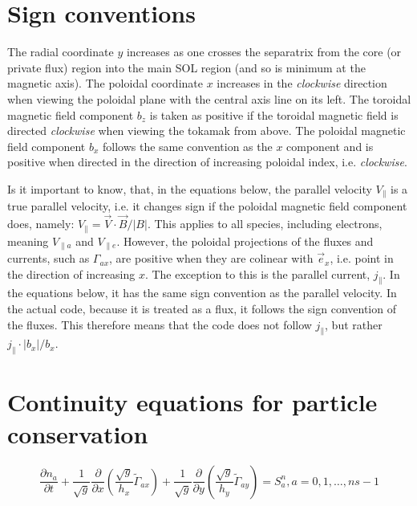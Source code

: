\documentclass[a4paper,10pt]{report}
\begin{document}
\section*{Sign conventions}

The radial coordinate $y$ increases as one crosses the separatrix from the core (or private flux) region into the main SOL region (and so is minimum at the magnetic axis). The poloidal coordinate $x$ increases in the {\em clockwise} direction when viewing the poloidal plane with the central axis line on its left. The toroidal magnetic field component $b_z$ is taken as positive if the toroidal magnetic field is directed {\em clockwise} when viewing the tokamak from above. The poloidal magnetic field component $b_x$ follows the same convention as the $x$ component and is positive when directed in the direction of increasing poloidal index, i.e. {\em clockwise}.

Is it important to know, that, in the equations below, the parallel velocity $V_\parallel$ is a true parallel velocity, i.e. it changes sign if the poloidal magnetic field component does, namely: $V_\parallel = \vec{V} \cdot \vec{B} / \left| B \right|$. This applies to all species, including electrons, meaning $V_{\parallel a}$ and $V_{\parallel e}$. However, the poloidal projections of the fluxes and currents, such as $\Gamma_{ax}$, are positive when they are colinear with $\vec{e}_x$, i.e. point in the direction of increasing $x$. The exception to this is the parallel current, $j_\parallel$. In the equations below, it has the same sign convention as the parallel velocity. In the actual code, because it is treated as a flux, it follows the sign convention of the fluxes. This therefore means that the code does not follow $j_\parallel$, but rather $j_\parallel \cdot |b_x|/b_x$.


\section{Continuity equations for particle conservation}

\begin{equation}
\frac{\partial n_a}{\partial t} + \frac{1}{\sqrt g}\frac{\partial}{\partial x}\left( \frac{\sqrt g}{h_x} \widetilde{\Gamma}_{ax} \right) +   \frac{1}{\sqrt g}\frac{\partial}{\partial y}\left( \frac{\sqrt g}{h_y} \widetilde{\Gamma}_{ay} \right) = S_a^n, a = 0, 1, \ldots, ns-1
\end{equation}
\end{document}
